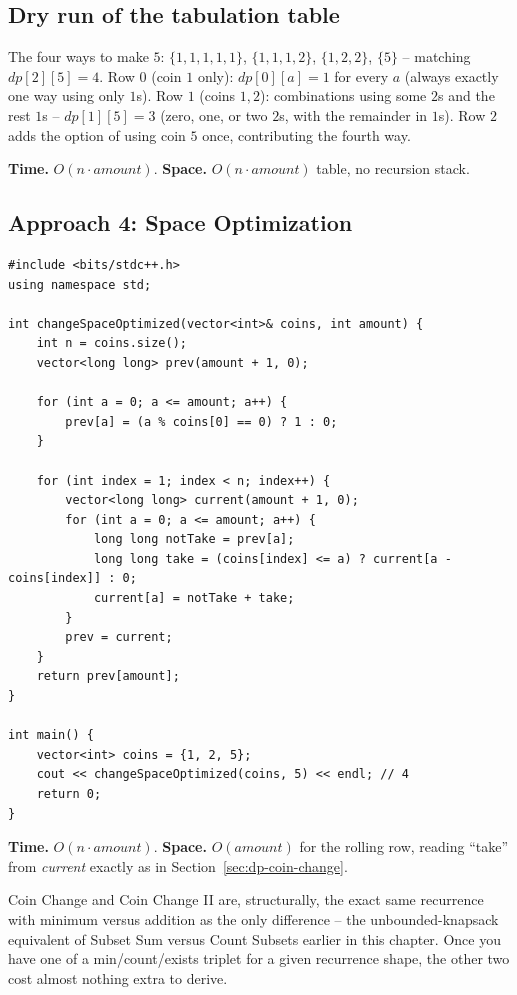 \subsection*{Dry run of the tabulation table}


The four ways to make $5$: $\{1,1,1,1,1\}$, $\{1,1,1,2\}$,
$\{1,2,2\}$, $\{5\}$ -- matching $\textit{dp}[2][5]=4$. Row $0$ (coin
$1$ only): $\textit{dp}[0][a]=1$ for every $a$ (always exactly one way
using only $1$s). Row $1$ (coins $1,2$): combinations using some
$2$s and the rest $1$s -- $\textit{dp}[1][5]=3$ (zero, one, or two
$2$s, with the remainder in $1$s). Row $2$ adds the option of using
coin $5$ once, contributing the fourth way.

\begin{complexitybox}
\textbf{Time.} $O(n \cdot \textit{amount})$.
\textbf{Space.} $O(n \cdot \textit{amount})$ table, no recursion stack.
\end{complexitybox}

\subsection*{Approach 4: Space Optimization}

\begin{lstlisting}
#include <bits/stdc++.h>
using namespace std;

int changeSpaceOptimized(vector<int>& coins, int amount) {
    int n = coins.size();
    vector<long long> prev(amount + 1, 0);

    for (int a = 0; a <= amount; a++) {
        prev[a] = (a % coins[0] == 0) ? 1 : 0;
    }

    for (int index = 1; index < n; index++) {
        vector<long long> current(amount + 1, 0);
        for (int a = 0; a <= amount; a++) {
            long long notTake = prev[a];
            long long take = (coins[index] <= a) ? current[a - coins[index]] : 0;
            current[a] = notTake + take;
        }
        prev = current;
    }
    return prev[amount];
}

int main() {
    vector<int> coins = {1, 2, 5};
    cout << changeSpaceOptimized(coins, 5) << endl; // 4
    return 0;
}
\end{lstlisting}

\begin{complexitybox}
\textbf{Time.} $O(n \cdot \textit{amount})$.
\textbf{Space.} $O(\textit{amount})$ for the rolling row, reading
``take'' from \textit{current} exactly as in
Section~\ref{sec:dp-coin-change}.
\end{complexitybox}

\begin{takeawaybox}
Coin Change and Coin Change II are, structurally, the exact same
recurrence with minimum versus addition as the only difference -- the
unbounded-knapsack equivalent of Subset Sum versus Count Subsets earlier
in this chapter. Once you have one of a min/count/exists triplet for a
given recurrence shape, the other two cost almost nothing extra to
derive.
\end{takeawaybox}
